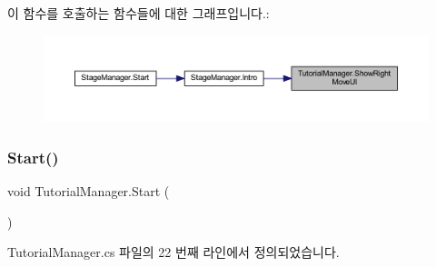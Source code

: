 \begin{DoxyCode}{0}

\end{DoxyCode}
이 함수를 호출하는 함수들에 대한 그래프입니다.\+:\nopagebreak
\begin{figure}[H]
\begin{center}
\leavevmode
\includegraphics[width=350pt]{d6/d14/class_tutorial_manager_ab5c041496c132c994a47cb144cae521d_icgraph}
\end{center}
\end{figure}
\mbox{\label{class_tutorial_manager_a51ab9e8dbee6bbd7a9e59a1e86c62c72}} 
\subsubsection{\texorpdfstring{Start()}{Start()}}
{\footnotesize\ttfamily void Tutorial\+Manager.\+Start (\begin{DoxyParamCaption}{ }\end{DoxyParamCaption})\hspace{0.3cm}{\ttfamily [private]}}



Tutorial\+Manager.\+cs 파일의 22 번째 라인에서 정의되었습니다.


